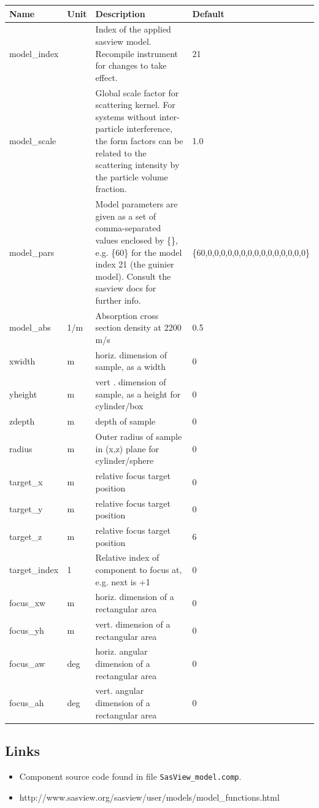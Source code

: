 \begin{longtable}{p{}p{}p{}p{}}
\toprule
\textbf{Name} & \textbf{Unit} & \textbf{Description} & \textbf{Default} \\
\midrule
\endhead
model\_index &  & Index of the applied sasview model. Recompile instrument for changes to take effect. & 21 \\
model\_scale &  & Global scale factor for scattering kernel. For systems without inter-particle interference, the form factors  can be related to the scattering intensity by the particle volume fraction. & 1.0 \\
model\_pars &  & Model parameters are given as a set of comma-separated values enclosed by \{\}, e.g. \{60\} for the model index 21 (the guinier model). Consult the sasview docs for further info. & \{60,0,0,0,0,0,0,0,0,0,0,0,0,0,0,0\} \\
model\_abs & 1/m & Absorption cross section density at 2200 m/s & 0.5 \\
xwidth & m & horiz. dimension of sample, as a width & 0 \\
yheight & m & vert . dimension of sample, as a height for cylinder/box & 0 \\
zdepth & m & depth of sample & 0 \\
radius & m & Outer radius of sample in (x,z) plane for cylinder/sphere & 0 \\
target\_x & m & relative focus target position & 0 \\
target\_y & m & relative focus target position & 0 \\
target\_z & m & relative focus target position & 6 \\
target\_index & 1 & Relative index of component to focus at, e.g. next is +1 & 0 \\
focus\_xw & m & horiz. dimension of a rectangular area & 0 \\
focus\_yh & m & vert.  dimension of a rectangular area & 0 \\
focus\_aw & deg & horiz. angular dimension of a rectangular area & 0 \\
focus\_ah & deg & vert.  angular dimension of a rectangular area & 0 \\
\bottomrule
\end{longtable}

\subsection*{Links}
\begin{itemize}
  \item Component source code found in file \texttt{SasView\_model.comp}.
  \item http://www.sasview.org/sasview/user/models/model\_functions.html
\end{itemize}

